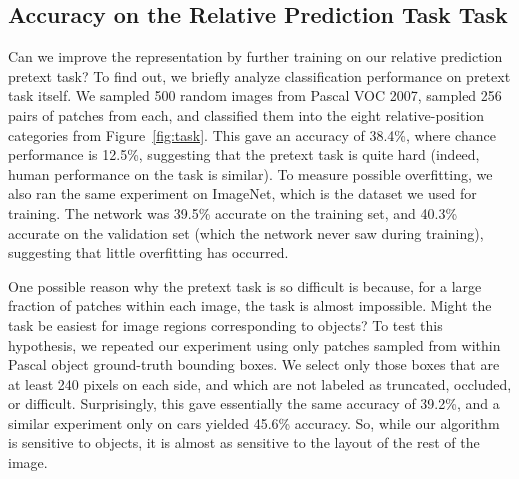\documentclass[10pt,twocolumn,letterpaper]{article}
\begin{document}
\subsection{Accuracy on the Relative Prediction Task Task}\label{pretext}
Can we improve the representation by further training on our relative prediction pretext task?  To find out, we briefly analyze classification performance on pretext task itself.
We sampled 500 random images from Pascal VOC 2007, sampled 256 pairs of patches from each, and classified them into the eight relative-position categories from Figure~\ref{fig:task}.  This gave an accuracy of 38.4\%, where chance performance is 12.5\%, suggesting that the pretext task is quite hard (indeed, human performance on the task is similar).  
To measure possible overfitting, we also ran the same experiment on ImageNet, which is the dataset we used for training.  The network was 39.5\% accurate on the training set, and 40.3\% accurate on the validation set (which the network never saw during training), suggesting that little overfitting has occurred.

One possible reason why the pretext task is so difficult is because, for a large fraction of patches within each image, the task is almost impossible.  Might the task be easiest for image regions corresponding to objects? To test this hypothesis, we repeated our experiment using only patches sampled from within Pascal object ground-truth bounding boxes.  We select only those boxes that are at least 240 pixels on each side, and which are not labeled as truncated, occluded, or difficult.  Surprisingly, this gave essentially the same accuracy of 39.2\%, %
and a similar experiment only on cars yielded 45.6\% accuracy.   So, while our algorithm is sensitive to objects, it is almost as sensitive to the layout of the rest of the image.  
\end{document}
